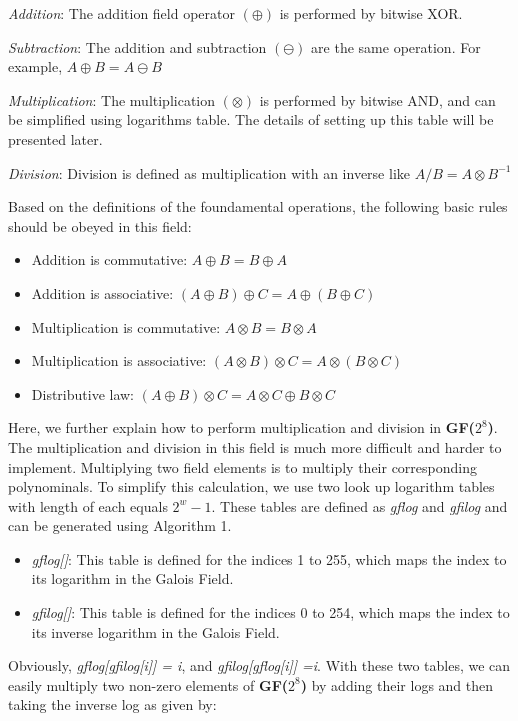 \documentclass[conference]{IEEEtran}
\begin{document}
\emph{Addition}: The addition field operator $(\oplus)$ is  performed by bitwise XOR. 

\emph{Subtraction}: The addition and subtraction $(\ominus)$ are the same operation. For example, $A \oplus B = A \ominus B$

\emph{Multiplication}: The multiplication $(\otimes)$ is performed by bitwise AND, and can be simplified using logarithms table. The details of setting up this table will be presented later.

\emph{Division}: Division is defined as multiplication with an inverse like $A/B = A \otimes B^{-1}$

Based on the definitions of the foundamental operations, the following basic rules should be obeyed in this field:

\begin{itemize}
	\item Addition is commutative: $A \oplus B = B \oplus A$
	\item Addition is associative:    $(A \oplus B) \oplus C = A \oplus (B \oplus C) $
	\item Multiplication is commutative: $A \otimes B = B \otimes A$
	\item Multiplication is associative: $(A \otimes B) \otimes C = A \otimes (B \otimes C)$
	\item  Distributive law: $(A \oplus B) \otimes C = A \otimes C  \oplus B \otimes C$
\end{itemize}

Here, we further explain how to perform multiplication and division in \textbf{GF($2^8$)}. The multiplication and division in this field is much more difficult and harder to implement. Multiplying two field elements is to multiply their corresponding polynominals. To simplify this calculation, we use two look up logarithm tables with length of each equals $2^w-1$. These tables are defined as \emph{gflog} and \emph{gfilog} and can be generated using Algorithm 1.

\begin{itemize}
	\item \emph{gflog[]}: This table is defined for the indices 1 to 255, which maps the index to its logarithm in the Galois Field.
	\item \emph{gfilog[]}: This table is defined for the indices 0 to 254, which maps the index to its inverse logarithm in the Galois Field. 
\end{itemize}

Obviously, \emph{gflog[gfilog[i]] = i}, and \emph{gfilog[gflog[i]] =i}. With these two tables, we can easily multiply two non-zero elements of \textbf{GF($2^8$)} by adding their logs and then taking the inverse log as given by:
\end{document}
